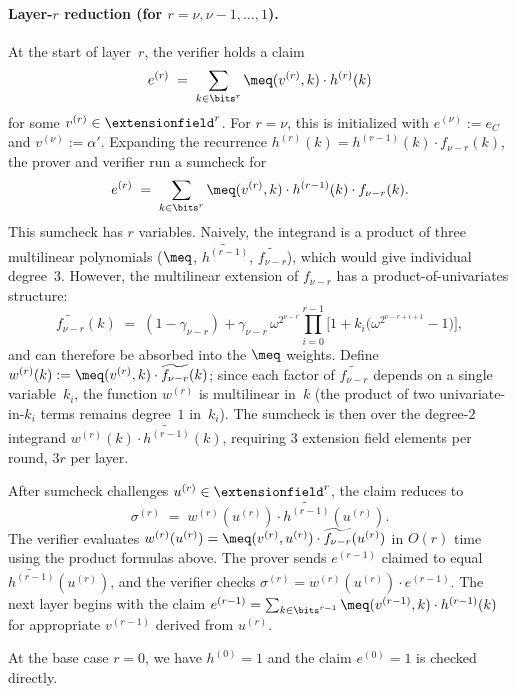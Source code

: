 \paragraph{Layer-$r$ reduction (for $r = \nu, \nu-1, \ldots, 1$).} At the start of layer~$r$, the verifier holds a claim
\[
    e^{(r)} \;=\; \sum_{k \in \bits^r} \meq(v^{(r)}, k) \cdot h^{(r)}(k)
\]
for some $v^{(r)} \in \extensionfield^r$.
For $r = \nu$, this is initialized with $e^{(\nu)} := e_C$ and $v^{(\nu)} := \alpha'$.
Expanding the recurrence $h^{(r)}(k) = h^{(r-1)}(k) \cdot f_{\nu-r}(k)$, the prover and verifier run a sumcheck for
\[
    e^{(r)} \;=\; \sum_{k \in \bits^r} \meq(v^{(r)}, k) \cdot h^{(r-1)}(k) \cdot f_{\nu-r}(k).
\]
This sumcheck has $r$ variables.
Naively, the integrand is a product of three multilinear polynomials ($\meq$, $\widetilde{h^{(r-1)}}$, $\widetilde{f_{\nu-r}}$), which would give individual degree~$3$.
However, the multilinear extension of $f_{\nu-r}$ has a product-of-univariates structure:
\[
    \widetilde{f_{\nu-r}}(k) \;=\; (1-\gamma_{\nu-r}) + \gamma_{\nu-r}\, \omega^{2^{\nu-r}} \prod_{i=0}^{r-1}\Big[1 + k_i\big(\omega^{2^{\nu-r+i+1}} - 1\big)\Big],
\]
and can therefore be absorbed into the $\meq$ weights.
Define $w^{(r)}(k) := \meq(v^{(r)}, k) \cdot \widetilde{f_{\nu-r}}(k)$; since each factor of $\widetilde{f_{\nu-r}}$ depends on a single variable~$k_i$, the function $w^{(r)}$ is multilinear in~$k$ (the product of two univariate-in-$k_i$ terms remains degree~$1$ in~$k_i$).
The sumcheck is then over the degree-$2$ integrand $w^{(r)}(k) \cdot \widetilde{h^{(r-1)}}(k)$, requiring $3$ extension field elements per round, $3r$ per layer.

After sumcheck challenges $u^{(r)} \in \extensionfield^r$, the claim reduces to
\[
    \sigma^{(r)} \;=\; w^{(r)}(u^{(r)}) \cdot \widetilde{h^{(r-1)}}(u^{(r)}).
\]
The verifier evaluates $w^{(r)}(u^{(r)}) = \meq(v^{(r)}, u^{(r)}) \cdot \widetilde{f_{\nu-r}}(u^{(r)})$ in $O(r)$ time using the product formulas above.
The prover sends $e^{(r-1)}$ claimed to equal $\widetilde{h^{(r-1)}}(u^{(r)})$, and the verifier checks $\sigma^{(r)} = w^{(r)}(u^{(r)}) \cdot e^{(r-1)}$.
The next layer begins with the claim $e^{(r-1)} = \sum_{k \in \bits^{r-1}} \meq(v^{(r-1)}, k) \cdot h^{(r-1)}(k)$ for appropriate $v^{(r-1)}$ derived from $u^{(r)}$.

At the base case $r = 0$, we have $h^{(0)} = 1$ and the claim $e^{(0)} = 1$ is checked directly.

